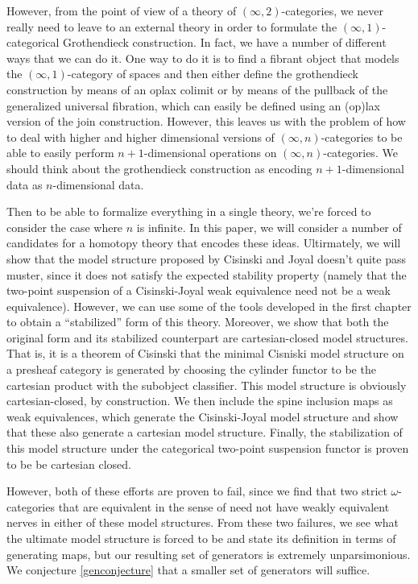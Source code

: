 \documentclass{amsbook}
\theoremstyle{plain}   %
\theoremstyle{remark}
\theoremstyle{plain}
\numberwithin{section}{chapter}
\begin{document}
However, from the point of view of a theory of \((\infty,2)\)-categories, we never really need to leave to an external theory in order to formulate the \((\infty,1)\)-categorical Grothendieck construction.  In fact, we have a number of different ways that we can do it.  One way to do it is to find a fibrant object that models the  \((\infty,1)\)-category of spaces and then either define the grothendieck construction by means of an oplax colimit or by means of the pullback of the generalized universal fibration, which can easily be defined using an (op)lax version of the join construction. However, this leaves us with the problem of how to deal with higher and higher dimensional versions of \((\infty, n)\)-categories to be able to easily perform \(n+1\)-dimensional operations on \((\infty,n)\)-categories.  We should think about the grothendieck construction as encoding \(n+1\)-dimensional data as \(n\)-dimensional data.  

Then to be able to formalize everything in a single theory, we're forced to consider the case where \(n\) is infinite.  In this paper, we will consider a number of candidates for a homotopy theory that encodes these ideas.  Ultirmately, we will show that the model structure proposed by Cisinski and Joyal doesn't quite pass muster, since it does not satisfy the expected stability property (namely that the two-point suspension of a Cisinski-Joyal weak equivalence need not be a weak equivalence).  However, we can use some of the tools developed in the first chapter to obtain a ``stabilized'' form of this theory.  Moreover, we show that both the original form and its stabilized counterpart are cartesian-closed model structures.  That is, it is a theorem of Cisinski that the minimal Cisniski model structure on a presheaf category is generated by choosing the cylinder functor to be the cartesian product with the subobject classifier.  This model structure is obviously cartesian-closed, by construction.  We then include the spine inclusion maps as weak equivalences, which generate the Cisinski-Joyal model structure and show that these also generate a cartesian model structure.   Finally, the stabilization of this model structure under the categorical two-point suspension functor is proven to be be cartesian closed.

However, both of these efforts are proven to fail, since we find that two strict \(\omega\)-categories that are equivalent in the sense of \cite{lmw} need not have weakly equivalent nerves in either of these model structures.  From these two failures, we see what the ultimate model structure is forced to be and state its definition in terms of generating maps, but our resulting set of generators is extremely unparsimonious.  We conjecture \eqref{genconjecture} that a smaller set of generators will suffice. 
\end{document}
